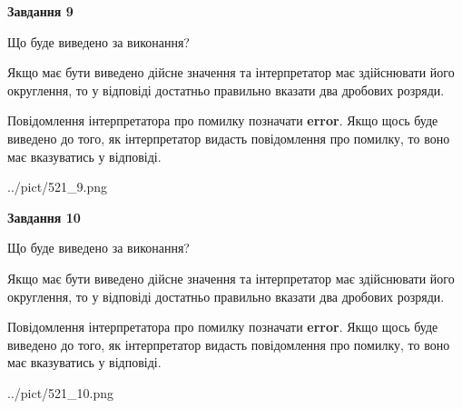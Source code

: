 \documentclass[12pt, ukrainian]{article}
\begin{document}
{\begin {Large}
{\begin {center}\textbf{Завдання 9}\end {center}}\par
Що буде виведено за виконання? \par

Якщо має бути виведено дійсне значення та інтерпретатор має здійснювати його округлення, 
то у відповіді достатньо правильно вказати два дробових розряди.

Повідомлення інтерпретатора про помилку позначати \textbf{error}.
Якщо щось буде виведено до того, як інтерпретатор видасть повідомлення про помилку, 
то воно має вказуватись у відповіді. \par

\begin{center}
	{../pict/521_9.png}
\end{center}
\newpage

{\begin {center}\textbf{Завдання 10}\end {center}}\par
Що буде виведено за виконання? \par

Якщо має бути виведено дійсне значення та інтерпретатор має здійснювати його округлення, 
то у відповіді достатньо правильно вказати два дробових розряди.

Повідомлення інтерпретатора про помилку позначати \textbf{error}.
Якщо щось буде виведено до того, як інтерпретатор видасть повідомлення про помилку, 
то воно має вказуватись у відповіді. \par

\begin{center}
	{../pict/521_10.png}
\end{center}
\newpage

\end {Large}}
\end{document}
